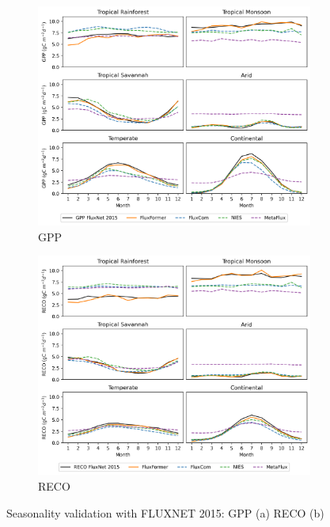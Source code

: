 \begin{figure}[p]
    \centering
    \begin{subfigure}{\textwidth}
      \centering
      \includegraphics[width=.8\textwidth]{figs/chap6/seasonal_fluxnet_GPP.png}
      \caption{GPP}
      \label{fig:chap6_fig4a}
    \end{subfigure}

    \begin{subfigure}{\textwidth}
      \centering
      \includegraphics[width=.8\textwidth]{figs/chap6/seasonal_fluxnet_RECO.png}
      \caption{RECO}
      \label{fig:chap6_fig4b}
    \end{subfigure}
    \caption[Seasonality validation with FLUXNET 2015]{Seasonality validation with FLUXNET 2015: GPP (a) RECO (b)}
    \label{fig:chap6_fig4}
\end{figure}

